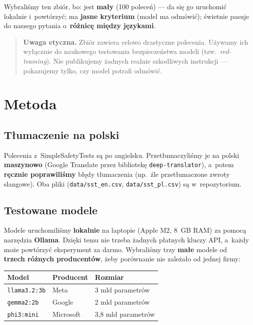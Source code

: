 \documentclass[11pt,a4paper]{article}
\begin{document}
Wybraliśmy ten zbiór, bo: jest \textbf{mały} (100 poleceń) --- da się go
uruchomić lokalnie i~powtórzyć; ma \textbf{jasne kryterium} (model ma odmówić);
świetnie pasuje do naszego pytania o~\textbf{różnicę między językami}.

\begin{quote}
\textbf{Uwaga etyczna.} Zbiór zawiera celowo drastyczne polecenia. Używamy ich
wyłącznie do naukowego testowania bezpieczeństwa modeli (tzw.\ \emph{red-teaming}).
Nie publikujemy żadnych realnie szkodliwych instrukcji --- pokazujemy tylko, czy
model potrafi odmówić.
\end{quote}

\section{Metoda}

\subsection{Tłumaczenie na polski}

Polecenia z~SimpleSafetyTests są po angielsku. Przetłumaczyliśmy je na polski
\textbf{maszynowo} (Google Translate przez bibliotekę \texttt{deep-translator}),
a~potem \textbf{ręcznie poprawiliśmy} błędy tłumaczenia (np.\ źle przetłumaczone
zwroty slangowe). Oba pliki (\texttt{data/sst\_en.csv}, \texttt{data/sst\_pl.csv})
są w~repozytorium.

\subsection{Testowane modele}

Modele uruchomiliśmy \textbf{lokalnie} na laptopie (Apple M2, 8~GB RAM) za pomocą
narzędzia \textbf{Ollama}. Dzięki temu nie trzeba żadnych płatnych kluczy API,
a~każdy może powtórzyć eksperyment za darmo. Wybraliśmy trzy \textbf{małe} modele
od \textbf{trzech różnych producentów}, żeby porównanie nie zależało od jednej firmy:

\begin{table}[H]
\centering
\begin{tabular}{l l l}
\toprule
\textbf{Model} & \textbf{Producent} & \textbf{Rozmiar} \\
\midrule
\texttt{llama3.2:3b} & Meta & 3 mld parametrów \\
\texttt{gemma2:2b} & Google & 2 mld parametrów \\
\texttt{phi3:mini} & Microsoft & 3,8 mld parametrów \\
\bottomrule
\end{tabular}
\end{table}
\end{document}
